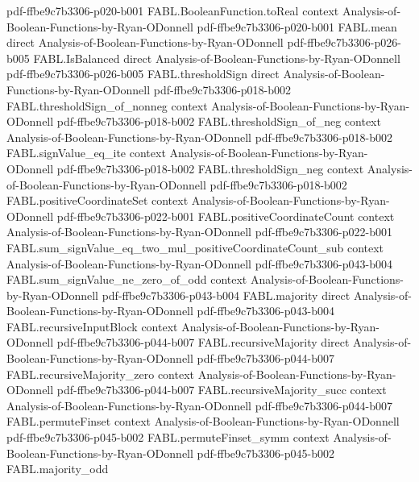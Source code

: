 \begin{theorem}
  {pdf-ffbe9c7b3306-p020-b001}
\proofstep
  {FABL.BooleanFunction.toReal}
  {context}
  {Analysis-of-Boolean-Functions-by-Ryan-ODonnell}
  {pdf-ffbe9c7b3306-p020-b001}
\proofstep
  {FABL.mean}
  {direct}
  {Analysis-of-Boolean-Functions-by-Ryan-ODonnell}
  {pdf-ffbe9c7b3306-p026-b005}
\proofstep
  {FABL.IsBalanced}
  {direct}
  {Analysis-of-Boolean-Functions-by-Ryan-ODonnell}
  {pdf-ffbe9c7b3306-p026-b005}
\proofstep
  {FABL.thresholdSign}
  {direct}
  {Analysis-of-Boolean-Functions-by-Ryan-ODonnell}
  {pdf-ffbe9c7b3306-p018-b002}
\proofstep
  {FABL.thresholdSign_of_nonneg}
  {context}
  {Analysis-of-Boolean-Functions-by-Ryan-ODonnell}
  {pdf-ffbe9c7b3306-p018-b002}
\proofstep
  {FABL.thresholdSign_of_neg}
  {context}
  {Analysis-of-Boolean-Functions-by-Ryan-ODonnell}
  {pdf-ffbe9c7b3306-p018-b002}
\proofstep
  {FABL.signValue_eq_ite}
  {context}
  {Analysis-of-Boolean-Functions-by-Ryan-ODonnell}
  {pdf-ffbe9c7b3306-p018-b002}
\proofstep
  {FABL.thresholdSign_neg}
  {context}
  {Analysis-of-Boolean-Functions-by-Ryan-ODonnell}
  {pdf-ffbe9c7b3306-p018-b002}
\proofstep
  {FABL.positiveCoordinateSet}
  {context}
  {Analysis-of-Boolean-Functions-by-Ryan-ODonnell}
  {pdf-ffbe9c7b3306-p022-b001}
\proofstep
  {FABL.positiveCoordinateCount}
  {context}
  {Analysis-of-Boolean-Functions-by-Ryan-ODonnell}
  {pdf-ffbe9c7b3306-p022-b001}
\proofstep
  {FABL.sum_signValue_eq_two_mul_positiveCoordinateCount_sub}
  {context}
  {Analysis-of-Boolean-Functions-by-Ryan-ODonnell}
  {pdf-ffbe9c7b3306-p043-b004}
\proofstep
  {FABL.sum_signValue_ne_zero_of_odd}
  {context}
  {Analysis-of-Boolean-Functions-by-Ryan-ODonnell}
  {pdf-ffbe9c7b3306-p043-b004}
\proofstep
  {FABL.majority}
  {direct}
  {Analysis-of-Boolean-Functions-by-Ryan-ODonnell}
  {pdf-ffbe9c7b3306-p043-b004}
\proofstep
  {FABL.recursiveInputBlock}
  {context}
  {Analysis-of-Boolean-Functions-by-Ryan-ODonnell}
  {pdf-ffbe9c7b3306-p044-b007}
\proofstep
  {FABL.recursiveMajority}
  {direct}
  {Analysis-of-Boolean-Functions-by-Ryan-ODonnell}
  {pdf-ffbe9c7b3306-p044-b007}
\proofstep
  {FABL.recursiveMajority_zero}
  {context}
  {Analysis-of-Boolean-Functions-by-Ryan-ODonnell}
  {pdf-ffbe9c7b3306-p044-b007}
\proofstep
  {FABL.recursiveMajority_succ}
  {context}
  {Analysis-of-Boolean-Functions-by-Ryan-ODonnell}
  {pdf-ffbe9c7b3306-p044-b007}
\proofstep
  {FABL.permuteFinset}
  {context}
  {Analysis-of-Boolean-Functions-by-Ryan-ODonnell}
  {pdf-ffbe9c7b3306-p045-b002}
\proofstep
  {FABL.permuteFinset_symm}
  {context}
  {Analysis-of-Boolean-Functions-by-Ryan-ODonnell}
  {pdf-ffbe9c7b3306-p045-b002}
\proofstep
  {FABL.majority_odd}

\end{theorem}
